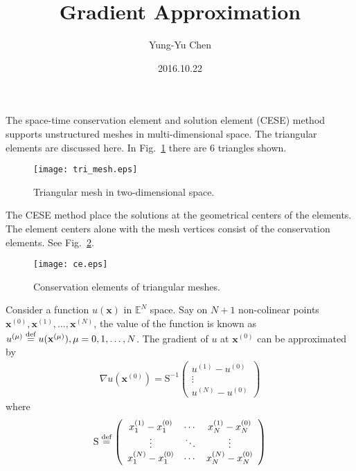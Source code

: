 \documentclass[a4paper,12pt,dvips]{article}
\newcommand*\defeq{\buildrel{\text{def}}\over{=}}
\begin{document}
\title{Gradient Approximation}
\author{Yung-Yu Chen}
\date{2016.10.22}

\maketitle


The space-time conservation element and solution element (CESE) method supports
unstructured meshes in multi-dimensional space.  The triangular elements are
discussed here.  In Fig.~\ref{f:tri_mesh} there are 6 triangles shown.

\begin{figure}[htbp]
\centering
\texttt{[image: tri\_mesh.eps]}
\caption{Triangular mesh in two-dimensional space.}
\label{f:tri_mesh}
\end{figure}

The CESE method place the solutions at the geometrical centers of the elements.
The element centers alone with the mesh vertices consist of the conservation
elements.  See Fig.~\ref{f:ce}.

\begin{figure}[htbp]
\centering
\texttt{[image: ce.eps]}
\caption{Conservation elements of triangular meshes.}
\label{f:ce}
\end{figure}

Consider a function $u(\mathbf{x})$ in $\mathbb{E}^N$ space.  Say on $N+1$
non-colinear points $\mathbf{x}^{(0)}, \mathbf{x}^{(1)}, \ldots,
\mathbf{x}^{(N)}$, the value of the function is known as $u^{(\mu)} \defeq
u(\mathbf{x}^{(\mu)}), \mu = 0, 1, \ldots, N$.  The gradient of $u$ at
$\mathbf{x}^{(0)}$ can be approximated by
\begin{align}
\nabla u(\mathbf{x}^{(0)}) = \mathrm{S}^{-1} \left(\begin{array}{c}
  u^{(1)} - u^{(0)} \\ \vdots \\ u^{(N)} - u^{(0)}
\end{array}\right)
\end{align}
where
\begin{align}
\mathrm{S} \defeq \left(\begin{array}{ccc}
  x^{(1)}_1 - x^{(0)}_1 &
  \cdots &
  x^{(1)}_N - x^{(0)}_N \\
  \vdots & \ddots & \vdots \\
  x^{(N)}_1 - x^{(0)}_1 &
  \cdots &
  x^{(N)}_N - x^{(0)}_N
\end{array}\right)
\end{align}

\end{document}
